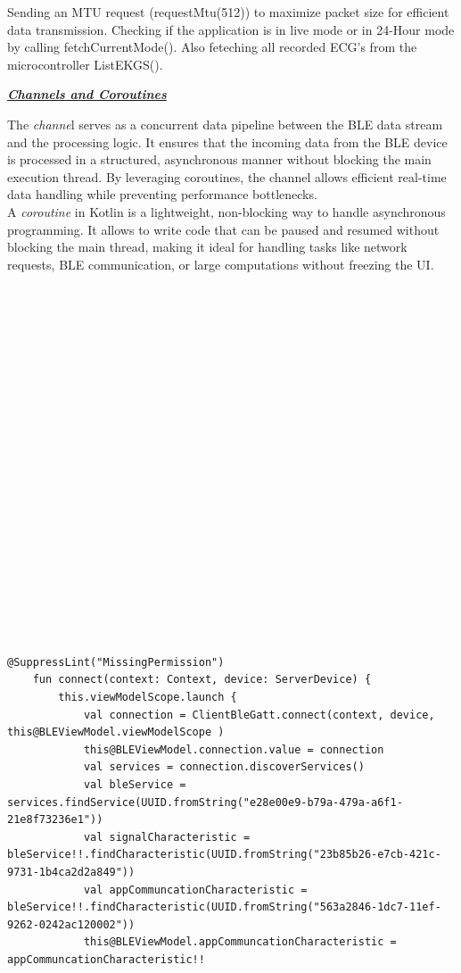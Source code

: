 {{	Sending an MTU request (requestMtu(512)) to maximize packet size for efficient data transmission.
	Checking if the application is in live mode or in 24-Hour mode by calling fetchCurrentMode(). Also feteching all recorded ECG's from the microcontroller ListEKGS().}
		
\underline{\textit{\textbf{ Channels and Coroutines}}}

The \textit{channe}l serves as a concurrent data pipeline between the BLE data stream and the processing logic. It ensures that the incoming data from the BLE device is processed in a structured, asynchronous manner without blocking the main execution thread. By leveraging coroutines, the channel allows efficient real-time data handling while preventing performance bottlenecks. \cite{kotlin_channels}\\
A \textit{coroutine} in Kotlin is a lightweight, non-blocking way to handle asynchronous programming. It allows to write code that can be paused and resumed without blocking the main thread, making it ideal for handling tasks like network requests, BLE communication, or large computations without freezing the UI. \cite{kotlin_coroutines_basics}
\mbox{}\\
\mbox{}\\
\mbox{}\\
\mbox{}\\
\mbox{}\\
\mbox{}\\
\mbox{}\\
\mbox{}\\
\mbox{}\\
\mbox{}\\
\mbox{}\\
\mbox{}\\
\mbox{}\\
\mbox{}\\
\mbox{}\\
\mbox{}\\
\mbox{}\\
\mbox{}\\
\mbox{}\\
\mbox{}\\
\mbox{}\\
\mbox{}\\
\begin{lstlisting}[label={fig:simpleSourceGen.cs}, caption={Connect functionality code }]
	@SuppressLint("MissingPermission")
	fun connect(context: Context, device: ServerDevice) {
		this.viewModelScope.launch {
			val connection = ClientBleGatt.connect(context, device, this@BLEViewModel.viewModelScope )
			this@BLEViewModel.connection.value = connection
			val services = connection.discoverServices()
			val bleService = services.findService(UUID.fromString("e28e00e9-b79a-479a-a6f1-21e8f73236e1"))
			val signalCharacteristic = bleService!!.findCharacteristic(UUID.fromString("23b85b26-e7cb-421c-9731-1b4ca2d2a849"))
			val appCommuncationCharacteristic = bleService!!.findCharacteristic(UUID.fromString("563a2846-1dc7-11ef-9262-0242ac120002"))
			this@BLEViewModel.appCommuncationCharacteristic = appCommuncationCharacteristic!!
			

\end{lstlisting}}
